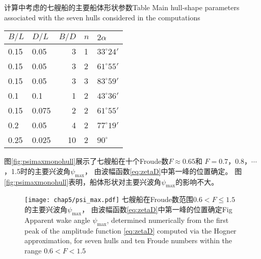 \begin{table}
  \centering
  \begin{minipage}[b]{0.6\textwidth}
    \captionstyle{\centering}
  {计算中考虑的七艘船的主要船体形状参数}{Table}
  {Main hull-shape parameters associated with the seven hulls considered in the
  computations}
\end{minipage}
  \begin{tabular*}{0.8\textwidth}{@{\extracolsep{\fill}}llrll@{}} \toprule
    $B/L$ & $D/L$ & $B/D$ & $n$ & $2\alpha$ \\ \midrule
    0.15 & 0.05 & 3 & 1 & $33^\circ24'$ \\
    0.15 & 0.05 & 3 & 2 & $61^\circ55'$ \\
    0.15 & 0.05 & 3 & 3 & $83^\circ59'$ \\
    0.1  & 0.1  & 1 & 2 & $43^\circ36'$ \\
    0.15 & 0.075& 2 & 2 & $61^\circ55'$ \\
    0.2  & 0.05 & 4 & 2 & $77^\circ19'$ \\
    0.25 & 0.025&10 & 2 & $90^\circ$ \\ \bottomrule
  \end{tabular*}
\end{table}

图\ref{fig:psimaxmonohull}展示了七艘船在十个Froude数$F\approx0.65$和
$F=0.7$，0.8，$\cdots$，1.5时的主要兴波角$\psi_{\max}$，
由波幅函数\eqref{eq:zetaD}中第一峰的位置确定。
图\ref{fig:psimaxmonohull}表明，船体形状对主要兴波角$\psi_{\max}$的影响不大。
%
\begin{figure}[htp]
  \centering
  \captionstyle{\centering}
  \texttt{[image: chap5/psi\_max.pdf]}
  {七艘船在Froude数范围$0.6<F\le1.5$的主要兴波角$\psi_{\max}$，
  由波幅函数\eqref{eq:zetaD}中第一峰的位置确定}{Fig}
  {Apparent wake angle $\psi_{\max}$, determined numerically from the first peak
  of the amplitude function \eqref{eq:zetaD} computed via the Hogner approximation,
for seven hulls and ten Froude numbers within the range $0.6<F<1.5$}
\end{figure}

